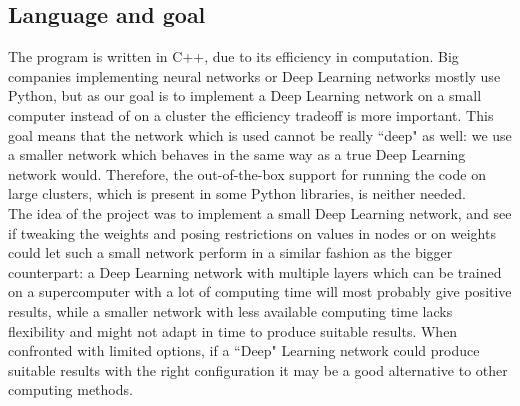 \documentclass[a4paper, 10pt, notitlepage, twocolumn]{article}
\begin{document}
 	\subsection{Language and goal}
      The program is written in C++,  due to its efficiency in computation. Big companies implementing neural networks or Deep Learning networks mostly use Python,  but as our goal is to implement a Deep Learning network on a small computer instead of on a cluster the efficiency tradeoff is more important. This goal means that the network which is used cannot be really ``deep" as well: we use a smaller network which behaves in the same way as a true Deep Learning network would. Therefore,  the out-of-the-box support for running the code on large clusters,  which is present in some Python libraries,  is neither needed.\\
      The idea of the project was to implement a small Deep Learning network,  and see if tweaking the weights and posing restrictions on values in nodes or on weights could let such a small network perform in a similar fashion as the bigger counterpart: a Deep Learning network with multiple layers which can be trained on a supercomputer with a lot of computing time will most probably give positive results,  while a smaller network with less available computing time lacks flexibility and might not adapt in time to produce suitable results. When confronted with limited options, if a ``Deep" Learning network could produce suitable results with the right configuration it may be a good alternative to other computing methods.\\
\end{document}
